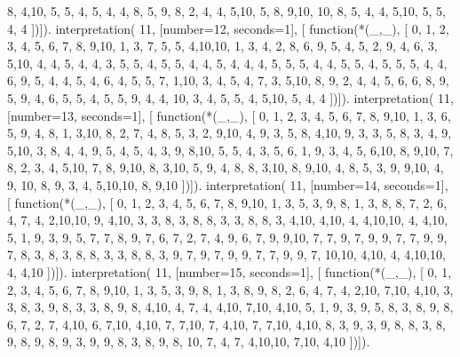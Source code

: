      8, 4,10, 5, 5, 4, 5, 4, 4, 8, 5,
     9, 8, 2, 4, 4, 5,10, 5, 8, 9,10,
    10, 8, 5, 4, 4, 5,10, 5, 5, 4, 4 ])]).
interpretation( 11, [number=12, seconds=1], [
  function(*(_,_), [
     0, 1, 2, 3, 4, 5, 6, 7, 8, 9,10,
     1, 3, 7, 5, 5, 4,10,10, 1, 3, 4,
     2, 8, 6, 9, 5, 4, 5, 2, 9, 4, 6,
     3, 5,10, 4, 4, 5, 4, 4, 3, 5, 5,
     4, 5, 5, 4, 4, 5, 4, 4, 4, 5, 5,
     5, 4, 4, 5, 5, 4, 5, 5, 5, 4, 4,
     6, 9, 5, 4, 4, 5, 4, 6, 4, 5, 5,
     7, 1,10, 3, 4, 5, 4, 7, 3, 5,10,
     8, 9, 2, 4, 4, 5, 6, 6, 8, 9, 5,
     9, 4, 6, 5, 5, 4, 5, 5, 9, 4, 4,
    10, 3, 4, 5, 5, 4, 5,10, 5, 4, 4 ])]).
interpretation( 11, [number=13, seconds=1], [
  function(*(_,_), [
     0, 1, 2, 3, 4, 5, 6, 7, 8, 9,10,
     1, 3, 6, 5, 9, 4, 8, 1, 3,10, 8,
     2, 7, 4, 8, 5, 3, 2, 9,10, 4, 9,
     3, 5, 8, 4,10, 9, 3, 3, 5, 8, 3,
     4, 9, 5,10, 3, 8, 4, 4, 9, 5, 4,
     5, 4, 3, 9, 8,10, 5, 5, 4, 3, 5,
     6, 1, 9, 3, 4, 5, 6,10, 8, 9,10,
     7, 8, 2, 3, 4, 5,10, 7, 8, 9,10,
     8, 3,10, 5, 9, 4, 8, 8, 3,10, 8,
     9,10, 4, 8, 5, 3, 9, 9,10, 4, 9,
    10, 8, 9, 3, 4, 5,10,10, 8, 9,10 ])]).
interpretation( 11, [number=14, seconds=1], [
  function(*(_,_), [
     0, 1, 2, 3, 4, 5, 6, 7, 8, 9,10,
     1, 3, 5, 3, 9, 8, 1, 3, 8, 8, 7,
     2, 6, 4, 7, 4, 2,10,10, 9, 4,10,
     3, 3, 8, 3, 8, 8, 3, 3, 8, 8, 3,
     4,10, 4,10, 4, 4,10,10, 4, 4,10,
     5, 1, 9, 3, 9, 5, 7, 7, 8, 9, 7,
     6, 7, 2, 7, 4, 9, 6, 7, 9, 9,10,
     7, 7, 9, 7, 9, 9, 7, 7, 9, 9, 7,
     8, 3, 8, 3, 8, 8, 3, 3, 8, 8, 3,
     9, 7, 9, 7, 9, 9, 7, 7, 9, 9, 7,
    10,10, 4,10, 4, 4,10,10, 4, 4,10 ])]).
interpretation( 11, [number=15, seconds=1], [
  function(*(_,_), [
     0, 1, 2, 3, 4, 5, 6, 7, 8, 9,10,
     1, 3, 5, 3, 9, 8, 1, 3, 8, 9, 8,
     2, 6, 4, 7, 4, 2,10, 7,10, 4,10,
     3, 3, 8, 3, 9, 8, 3, 3, 8, 9, 8,
     4,10, 4, 7, 4, 4,10, 7,10, 4,10,
     5, 1, 9, 3, 9, 5, 8, 3, 8, 9, 8,
     6, 7, 2, 7, 4,10, 6, 7,10, 4,10,
     7, 7,10, 7, 4,10, 7, 7,10, 4,10,
     8, 3, 9, 3, 9, 8, 8, 3, 8, 9, 8,
     9, 8, 9, 3, 9, 9, 8, 3, 8, 9, 8,
    10, 7, 4, 7, 4,10,10, 7,10, 4,10 ])]).

